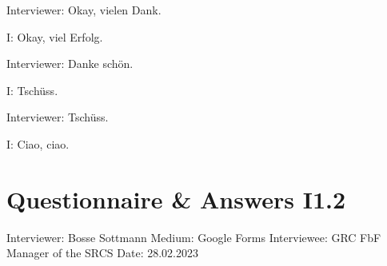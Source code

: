 Interviewer: Okay, vielen Dank. 

I: Okay, viel Erfolg. 

Interviewer: Danke sch{\"o}n. 

I: Tsch{\"u}ss. 

Interviewer: Tsch{\"u}ss. 

I: Ciao, ciao. 


\section{Questionnaire  \& Answers I1.2}
Interviewer: Bosse Sottmann\newline
Medium: Google Forms\newline
Interviewee: GRC FbF Manager of the SRCS \newline
Date: 28.02.2023

